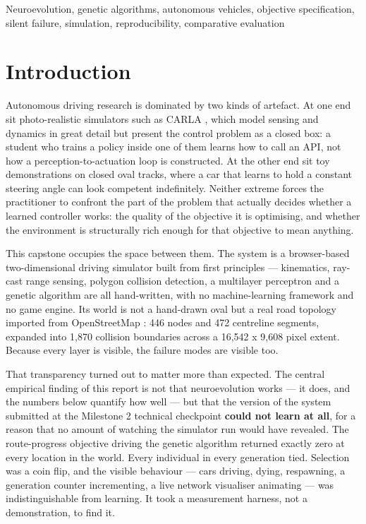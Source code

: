 \documentclass[conference]{IEEEtran}
\begin{document}
\begin{IEEEkeywords}
Neuroevolution, genetic algorithms, autonomous vehicles, objective specification, silent failure, simulation, reproducibility, comparative evaluation
\end{IEEEkeywords}

\section{Introduction}

\label{sec:intro}

Autonomous driving research is dominated by two kinds of artefact. At one end sit photo-realistic simulators such as CARLA \cite{carla}, which model sensing and dynamics in great detail but present the control problem as a closed box: a student who trains a policy inside one of them learns how to call an API, not how a perception-to-actuation loop is constructed. At the other end sit toy demonstrations on closed oval tracks, where a car that learns to hold a constant steering angle can look competent indefinitely. Neither extreme forces the practitioner to confront the part of the problem that actually decides whether a learned controller works: the quality of the objective it is optimising, and whether the environment is structurally rich enough for that objective to mean anything.

This capstone occupies the space between them. The system is a browser-based two-dimensional driving simulator built from first principles — kinematics, ray-cast range sensing, polygon collision detection, a multilayer perceptron and a genetic algorithm are all hand-written, with no machine-learning framework and no game engine. Its world is not a hand-drawn oval but a real road topology imported from OpenStreetMap \cite{osm}: 446 nodes and 472 centreline segments, expanded into 1,870 collision boundaries across a 16,542 x 9,608 pixel extent. Because every layer is visible, the failure modes are visible too.

That transparency turned out to matter more than expected. The central empirical finding of this report is not that neuroevolution works — it does, and the numbers below quantify how well — but that the version of the system submitted at the Milestone 2 technical checkpoint \textbf{could not learn at all}, for a reason that no amount of watching the simulator run would have revealed. The route-progress objective driving the genetic algorithm returned exactly zero at every location in the world. Every individual in every generation tied. Selection was a coin flip, and the visible behaviour — cars driving, dying, respawning, a generation counter incrementing, a live network visualiser animating — was indistinguishable from learning. It took a measurement harness, not a demonstration, to find it.
\end{document}

